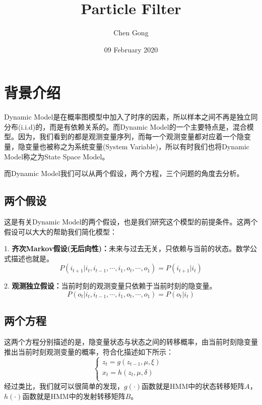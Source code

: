 \documentclass[a4paper]{article}
\title{Particle Filter}
\author{Chen Gong}
\date{09 February 2020}
\begin{document}
\maketitle
\tableofcontents
\newpage
\setcounter{page}{1} %
\clearpage

\section{背景介绍}
Dynamic Model是在概率图模型中加入了时序的因素，所以样本之间不再是独立同分布(i.i.d)的，而是有依赖关系的。而Dynamic Model的一个主要特点是，混合模型。因为，我们看到的都是观测变量序列，而每一个观测变量都对应着一个隐变量，隐变量也被称之为系统变量(System Variable)，所以有时我们也将Dynamic Model称之为State Space Model。

而Dynamic Model我们可以从两个假设，两个方程，三个问题的角度去分析。

\subsection{两个假设}
这是有关Dynamic Model的两个假设，也是我们研究这个模型的前提条件。这两个假设可以大大的帮助我们简化模型：

1.\textbf{ 齐次Markov假设(无后向性)：}未来与过去无关，只依赖与当前的状态。数学公式描述也就是。
\begin{equation}
    P(i_{t+1}|i_{t},i_{t-1},\cdots,i_1,o_t,\cdots,o_1) = P(i_{t+1}|i_t)
\end{equation}

2. \textbf{观测独立假设：}当前时刻的观测变量只依赖于当前时刻的隐变量。
\begin{equation}
    P(o_{t}|i_{t},i_{t-1},\cdots,i_1,o_t,\cdots,o_1) = P(o_{t}|i_t)
\end{equation}

\subsection{两个方程}
这两个方程分别描述的是，隐变量状态与状态之间的转移概率，由当前时刻隐变量推出当前时刻观测变量的概率，符合化描述如下所示：
\begin{equation}
    \left\{
        \begin{array}{ll}
            z_t = g(z_{t-1},\mu,\xi) & \\
            x_t = h(z_{t},\mu,\delta) & \\
        \end{array}
    \right.
\end{equation}
经过类比，我们就可以很简单的发现，$g(\cdot)$函数就是HMM中的状态转移矩阵$A$，$h(\cdot)$函数就是HMM中的发射转移矩阵$B$。
\end{document}
